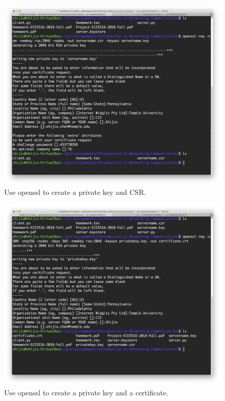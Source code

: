 \documentclass{article}
\begin{document}
\begin{figure}
    \centering
    \includegraphics[width=\linewidth]{fig/CSR.png}
    \caption{Use openssl to create a private key and CSR.
    } \label{fig:CSR}
\end{figure}

\begin{figure}
    \centering
    \includegraphics[width=\linewidth]{fig/certificate.png}
    \caption{Use openssl to create a private key and a certificate.
    } \label{fig:certificate}
\end{figure}
\end{document}
